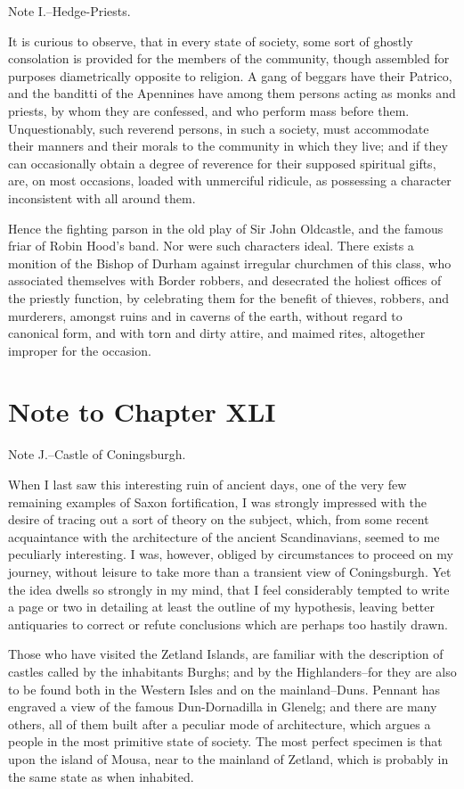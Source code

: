 Note I.--Hedge-Priests.

It is curious to observe, that in every state of society, some sort of
ghostly consolation is provided for the members of the community, though
assembled for purposes diametrically opposite to religion. A gang of
beggars have their Patrico, and the banditti of the Apennines have among
them persons acting as monks and priests, by whom they are confessed,
and who perform mass before them. Unquestionably, such reverend persons,
in such a society, must accommodate their manners and their morals to
the community in which they live; and if they can occasionally obtain a
degree of reverence for their supposed spiritual gifts, are, on most
occasions, loaded with unmerciful ridicule, as possessing a character
inconsistent with all around them.

Hence the fighting parson in the old play of Sir John Oldcastle, and the
famous friar of Robin Hood's band. Nor were such characters ideal. There
exists a monition of the Bishop of Durham against irregular churchmen of
this class, who associated themselves with Border robbers, and
desecrated the holiest offices of the priestly function, by celebrating
them for the benefit of thieves, robbers, and murderers, amongst ruins
and in caverns of the earth, without regard to canonical form, and with
torn and dirty attire, and maimed rites, altogether improper for the
occasion.

\section*{Note to Chapter XLI}\label{noteCXLI}

Note J.--Castle of Coningsburgh.

When I last saw this interesting ruin of ancient days, one of the very
few remaining examples of Saxon fortification, I was strongly impressed
with the desire of tracing out a sort of theory on the subject, which,
from some recent acquaintance with the architecture of the ancient
Scandinavians, seemed to me peculiarly interesting. I was, however,
obliged by circumstances to proceed on my journey, without leisure to
take more than a transient view of Coningsburgh. Yet the idea dwells so
strongly in my mind, that I feel considerably tempted to write a page or
two in detailing at least the outline of my hypothesis, leaving better
antiquaries to correct or refute conclusions which are perhaps too
hastily drawn.

Those who have visited the Zetland Islands, are familiar with the
description of castles called by the inhabitants Burghs; and by the
Highlanders--for they are also to be found both in the Western Isles and
on the mainland--Duns. Pennant has engraved a view of the famous
Dun-Dornadilla in Glenelg; and there are many others, all of them built
after a peculiar mode of architecture, which argues a people in the most
primitive state of society. The most perfect specimen is that upon the
island of Mousa, near to the mainland of Zetland, which is probably in
the same state as when inhabited.


